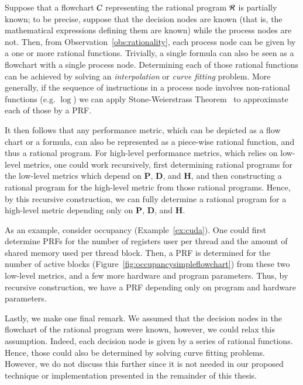 Suppose that a flowchart ${\cal C}$ 
representing the rational program ${\cal R}$
is partially known; to be precise, suppose that the decision nodes
are known (that is, the mathematical expressions
defining them are known) while the process nodes
are not. 
Then, from Observation~\ref{obs:rationality},
each process node can be given by
a one or more rational functions.
Trivially, a single formula can also
be seen as a flowchart with a single process node.
Determining each of those rational functions
can be achieved by solving an \textit{interpolation}
or \textit{curve fitting} problem.
More generally, if the sequence of instructions in 
a process node involves non-rational functions (e.g. $\log$)
we can apply Stone-Weierstrass Theorem~\cite{stone1948generalized}
to approximate each of those by a PRF.


It then follows that any performance metric,
which can be depicted as a flow chart
or a formula,
can also be represented as a piece-wise rational function, 
and thus a rational program. 
For high-level performance metrics, which relies on low-level metrics,
one could work recursively, first determining rational programs
for the low-level metrics which depend on $\bm{P}$, $\bm{D}$, and $\bm{H}$,
and then constructing a rational program for the high-level metric 
from those rational programs.
Hence, by this recursive construction, we can fully
determine a rational program for 
a high-level metric depending only on $\bm{P}$, $\bm{D}$, and $\bm{H}$.


As an example, consider occupancy (Example~\ref{ex:cuda}).
One could first determine PRFs for the number of
registers user per thread and the amount of shared memory
used per thread block. Then, a PRF is determined
for the number of active blocks (Figure~\ref{fig:occupancysimpleflowchart})
from these two low-level metrics, and a few more hardware
and program parameters. 
Thus, by recursive construction, 
we have a PRF depending only on 
program and hardware parameters.

Lastly, we make one final remark. 
We assumed that the decision nodes in the flowchart of the rational program were known, 
however, we could relax this assumption.
Indeed, each decision node is given by
a series of rational functions.
Hence, those could also be determined by
solving curve fitting problems.
However, we do not discuss this further
since it is not needed in our proposed
technique or implementation presented in the remainder of this thesis.
